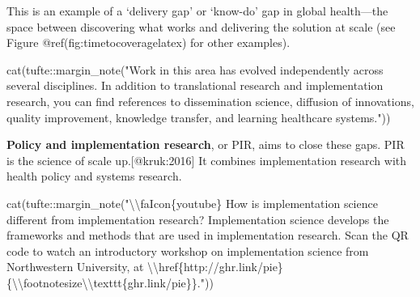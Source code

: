 \documentclass[
  letterpaper,
  DIV=11,
  numbers=noendperiod,
  oneside]{scrartcl}
\newenvironment{Shaded}{\begin{snugshade}}{\end{snugshade}}
\newcommand{\FunctionTok}[1]{\textcolor[rgb]{0.28,0.35,0.67}{#1}}
\newcommand{\NormalTok}[1]{\textcolor[rgb]{0.00,0.23,0.31}{#1}}
\newcommand{\SpecialCharTok}[1]{\textcolor[rgb]{0.37,0.37,0.37}{#1}}
\newcommand{\StringTok}[1]{\textcolor[rgb]{0.13,0.47,0.30}{#1}}
\begin{document}
This is an example of a `delivery gap' or `know-do' gap in global
health---the space between discovering what works and delivering the
solution at scale (see Figure @ref(fig:timetocoveragelatex) for other
examples).

\newpage

\begin{Shaded}
\begin{Highlighting}[]
\FunctionTok{cat}\NormalTok{(tufte}\SpecialCharTok{::}\FunctionTok{margin\_note}\NormalTok{(}\StringTok{"Work in this area has evolved independently across several disciplines. In addition to translational research and implementation research, you can find references to dissemination science, diffusion of innovations, quality improvement, knowledge transfer, and learning healthcare systems."}\NormalTok{))}
\end{Highlighting}
\end{Shaded}


\textbf{Policy and implementation research}, or PIR, aims to close these
gaps. PIR is the science of scale up.{[}@kruk:2016{]} It combines
implementation research with health policy and systems research.

\begin{Shaded}
\begin{Highlighting}[]
\FunctionTok{cat}\NormalTok{(tufte}\SpecialCharTok{::}\FunctionTok{margin\_note}\NormalTok{(}\StringTok{"}\SpecialCharTok{\textbackslash{}\textbackslash{}}\StringTok{faIcon\{youtube\} How is implementation science different from implementation research? Implementation science develops the frameworks and methods that are used in implementation research. Scan the QR code to watch an introductory workshop on implementation science from Northwestern University, at }\SpecialCharTok{\textbackslash{}\textbackslash{}}\StringTok{href\{http://ghr.link/pie\}\{}\SpecialCharTok{\textbackslash{}\textbackslash{}}\StringTok{footnotesize}\SpecialCharTok{\textbackslash{}\textbackslash{}}\StringTok{texttt\{ghr.link/pie\}\}."}\NormalTok{))}
\end{Highlighting}
\end{Shaded}

\end{document}
